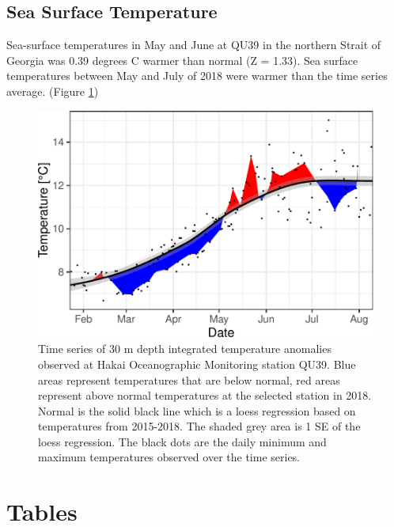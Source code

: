 \documentclass[fleqn,10pt]{wlpeerj} %
\begin{document}
\subsection*{Sea Surface Temperature}\label{sea-surface-temperature}

Sea-surface temperatures in May and June at QU39 in the northern Strait
of Georgia was 0.39 degrees C warmer than normal (Z = 1.33). Sea surface
temperatures between May and July of 2018 were warmer than the time
series average. (Figure \ref{fig:sst})

\begin{figure}[H]
\includegraphics[width=0.8\linewidth]{peer_j_migration_dynamics_files/figure-latex/sst-1} \caption{Time series of 30 m depth integrated temperature anomalies observed at Hakai Oceanographic Monitoring station QU39. Blue areas represent temperatures that are below normal, red areas represent above normal temperatures at the selected station in 2018. Normal is the solid black line which is a loess regression based on temperatures from 2015-2018. The shaded grey area is 1 SE of the loess regression. The black dots are the daily minimum and maximum temperatures observed over the time series.}\label{fig:sst}
\end{figure}

\section*{Tables}\label{tables}
\end{document}
